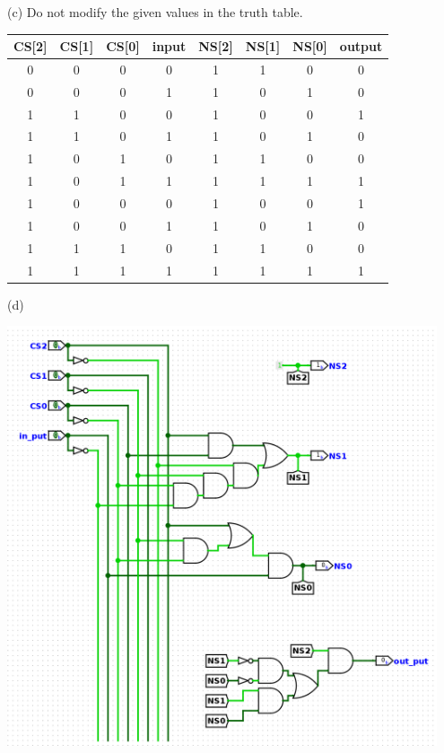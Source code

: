 \documentclass[a4paper]{article}
\begin{document}
\begin{answer}[Question 3]
    (c) Do not modify the given values in the truth table.\\
    \begin{center}
        \begin{tabular}{ |c|c|c|c||c|c|c|c| }
            \hline
            CS[2] & CS[1] & CS[0] & input & NS[2] & NS[1] & NS[0] & output \\
            \hline
            0     & 0     & 0     & 0     & 1     & 1     & 0     & 0      \\
            \hline
            0     & 0     & 0     & 1     & 1     & 0     & 1     & 0      \\
            \hline
            1     & 1     & 0     & 0     & 1     & 0     & 0     & 1      \\
            \hline
            1     & 1     & 0     & 1     & 1     & 0     & 1     & 0      \\
            \hline
            1     & 0     & 1     & 0     & 1     & 1     & 0     & 0      \\
            \hline
            1     & 0     & 1     & 1     & 1     & 1     & 1     & 1      \\
            \hline
            1     & 0     & 0     & 0     & 1     & 0     & 0     & 1      \\
            \hline
            1     & 0     & 0     & 1     & 1     & 0     & 1     & 0      \\
            \hline
            1     & 1     & 1     & 0     & 1     & 1     & 0     & 0      \\
            \hline
            1     & 1     & 1     & 1     & 1     & 1     & 1     & 1      \\
            \hline
        \end{tabular}
    \end{center}

    (d)

    \includegraphics[width=0.95\textwidth]{Q3.png}

\end{answer}
\end{document}
